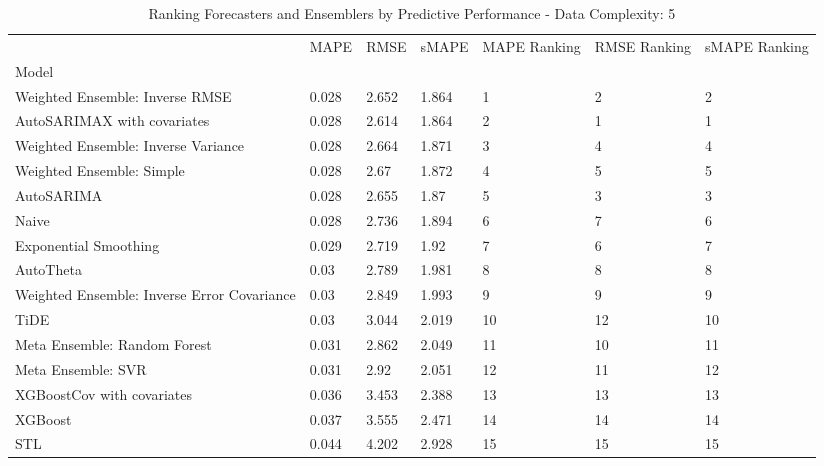 \begin{table}
\caption{Ranking Forecasters and Ensemblers by Predictive Performance - Data Complexity: 5}
\begin{tabular}{lllllll}
\toprule
 & MAPE & RMSE & sMAPE & MAPE Ranking & RMSE Ranking & sMAPE Ranking \\
Model &  &  &  &  &  &  \\
\midrule
Weighted Ensemble: Inverse RMSE & 0.028 & 2.652 & 1.864 & 1 & 2 & 2 \\
AutoSARIMAX with covariates & 0.028 & 2.614 & 1.864 & 2 & 1 & 1 \\
Weighted Ensemble: Inverse Variance & 0.028 & 2.664 & 1.871 & 3 & 4 & 4 \\
Weighted Ensemble: Simple & 0.028 & 2.67 & 1.872 & 4 & 5 & 5 \\
AutoSARIMA & 0.028 & 2.655 & 1.87 & 5 & 3 & 3 \\
Naive & 0.028 & 2.736 & 1.894 & 6 & 7 & 6 \\
Exponential Smoothing & 0.029 & 2.719 & 1.92 & 7 & 6 & 7 \\
AutoTheta & 0.03 & 2.789 & 1.981 & 8 & 8 & 8 \\
Weighted Ensemble: Inverse Error Covariance & 0.03 & 2.849 & 1.993 & 9 & 9 & 9 \\
TiDE & 0.03 & 3.044 & 2.019 & 10 & 12 & 10 \\
Meta Ensemble: Random Forest & 0.031 & 2.862 & 2.049 & 11 & 10 & 11 \\
Meta Ensemble: SVR & 0.031 & 2.92 & 2.051 & 12 & 11 & 12 \\
XGBoostCov with covariates & 0.036 & 3.453 & 2.388 & 13 & 13 & 13 \\
XGBoost & 0.037 & 3.555 & 2.471 & 14 & 14 & 14 \\
STL & 0.044 & 4.202 & 2.928 & 15 & 15 & 15 \\
\bottomrule
\end{tabular}
\end{table}
